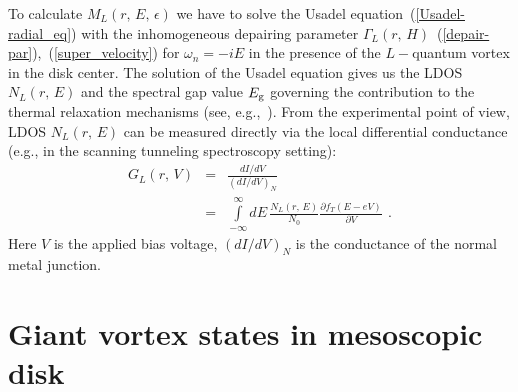 \documentclass[prx,twocolumn,aps,superscriptaddress,showpacs,amsmath,amssymb,footnoteinbib]{revtex4-1}
\begin{document}
To calculate $M_L(r,\,E,\,\epsilon)$ we have to solve the Usadel
equation~(\ref{Usadel-radial_eq}) with the inhomogeneous depairing
parameter
$\Gamma_L(r,\,H)$~(\ref{depair-par}),~(\ref{super_velocity}) for
$\omega_n = - i E$ in the presence of the $L-$quantum vortex in
the disk center. The solution of the Usadel equation gives us the
LDOS $N_L(r,\,E)$ and the spectral gap value $E_{\rm g}$ governing
the contribution to the thermal relaxation mechanisms (see, e.g.,~\cite{Taupin-Khaymovich-NatCom16,Nakamura17}). From the
experimental point of view, LDOS $N_L(r,\,E)$ can be measured
directly  via the local differential conductance (e.g., in the
scanning tunneling spectroscopy setting):
%
\begin{eqnarray}
 G_L(r,\,V) &=& \frac{d I/d V}{\left(d I/d V\right)_N} \label{loc-diff-cond} \\
 &=& \int\limits_{-\infty}^{\infty} d E\, %
 \frac{N_L(r,\,E)}{N_0}
 \frac{\partial f_T(E - e V)}{\partial V}\,\ . \nonumber
\end{eqnarray}
%
Here $V$ is the applied bias voltage, $(dI/dV)_N$ is the
conductance of the normal metal junction.


\section{Giant vortex states in mesoscopic disk} \label{GiantVortexStates}
\end{document}
